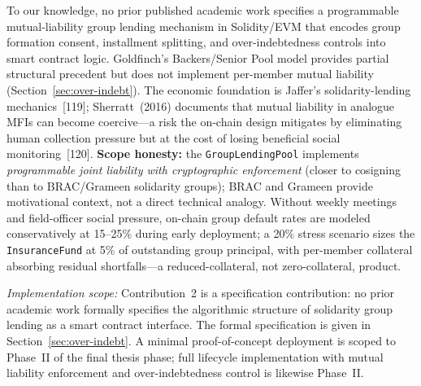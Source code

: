 \documentclass[12pt,a4paper]{report}
\begin{document}
\begin{description}[leftmargin=0pt]
\item[\textbf{Contribution 2 --- On-Chain Solidarity Group Lending.}]
To our knowledge, no prior published academic work specifies a programmable mutual-liability group lending mechanism in Solidity/EVM that encodes group formation consent, installment splitting, and over-indebtedness controls into smart contract logic. Goldfinch's Backers/Senior Pool model provides partial structural precedent but does not implement per-member mutual liability (Section~\ref{sec:over-indebt}). The economic foundation is Jaffer's solidarity-lending mechanics~[119]; Sherratt~(2016) documents that mutual liability in analogue MFIs can become coercive---a risk the on-chain design mitigates by eliminating human collection pressure but at the cost of losing beneficial social monitoring~[120]. \textbf{Scope honesty:} the \texttt{GroupLendingPool} implements \textit{programmable joint liability with cryptographic enforcement} (closer to cosigning than to BRAC/Grameen solidarity groups); BRAC and Grameen provide motivational context, not a direct technical analogy. Without weekly meetings and field-officer social pressure, on-chain group default rates are modeled conservatively at 15--25\% during early deployment; a 20\% stress scenario sizes the \texttt{InsuranceFund} at 5\% of outstanding group principal, with per-member collateral absorbing residual shortfalls---a reduced-collateral, not zero-collateral, product.

\textit{Implementation scope:} Contribution~2 is a specification contribution: no prior academic work formally specifies the algorithmic structure of solidarity group lending as a smart contract interface. The formal specification is given in Section~\ref{sec:over-indebt}. A minimal proof-of-concept deployment is scoped to Phase~II of the final thesis phase; full lifecycle implementation with mutual liability enforcement and over-indebtedness control is likewise Phase~II.


\end{description}
\end{document}
